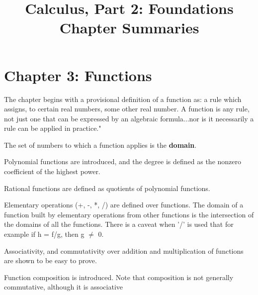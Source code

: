 \documentclass{article}
\begin{document}
\title{%
  Calculus, Part 2: Foundations \\
  \large Chapter Summaries}
\author{}
\date{}
\maketitle

\section*{Chapter 3: Functions}

\begin{flushleft}
The chapter begins with a provisional definition of a function as: a rule which assigns, to certain real numbers, some other real number. A function is any rule, not just one that can be expressed by an algebraic formula...nor is it necessarily a rule can be applied in practice."
\end{flushleft}

\begin{flushleft}
The set of numbers to which a function applies is the \textbf{domain}.
\end{flushleft}

\begin{flushleft}
Polynomial functions are introduced, and the degree is defined as the nonzero coefficient of the highest power.
\end{flushleft}

\begin{flushleft}
Rational functions are defined as quotients of polynomial functions.
\end{flushleft}

\begin{flushleft}
Elementary operations (+, -, *, /) are defined over functions. The domain of a function built by elementary operations from other functions is the intersection of the domains of all the functions. There is a caveat when '/' is used that for example if h = f/g, then g $\neq$ 0.
\end{flushleft}

\begin{flushleft}
Associativity, and commutativity over addition and multiplication of functions are shown to be easy to prove.
\end{flushleft}

\begin{flushleft}
Function composition is introduced. Note that composition is not generally commutative, although it is associative
\end{flushleft}
\end{document}
